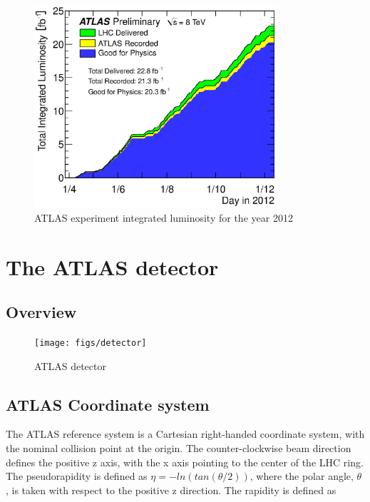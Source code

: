 \begin{figure}[H]
\begin{center}
\includegraphics[width=0.8\textwidth]{figs/lumi}
\caption{
ATLAS experiment integrated luminosity for the year 2012 \cite{lumi}
}
\label{intlumi}
\end{center}
\end{figure}




\section{The ATLAS detector}
\subsection{Overview}

\begin{figure}[H]
\begin{center}
\texttt{[image: figs/detector]}
\caption{
ATLAS detector\cite{detector}
}
\label{intlumi}
\end{center}
\end{figure}


\subsection{ATLAS Coordinate system}
The ATLAS reference system is a Cartesian right-handed coordinate system, with the
nominal collision point at the origin. The counter-clockwise beam direction defines the
positive z axis, with the x axis pointing to the center of the LHC ring. The pseudorapidity
is defined as  $\eta = -ln(tan (\theta/2))$, where the polar angle, $ \theta $ , is taken with respect to the
positive z direction. The rapidity is defined as

